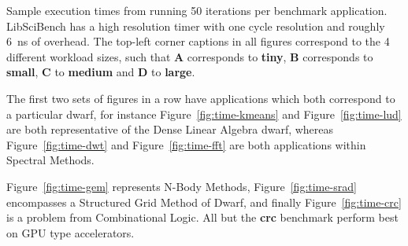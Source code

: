 \documentclass[../document.tex]{subfiles}
\begin{document}
%


Sample execution times from running 50 iterations per benchmark application.
LibSciBench has a high resolution timer with one cycle resolution and roughly \SI{6}{\nano\second} of overhead.
The top-left corner captions in all figures correspond to the 4 different workload sizes, such that {\bf A} corresponds to {\bf tiny}, {\bf B} corresponds to {\bf small}, {\bf C} to {\bf medium} and {\bf D} to {\bf large}.

The first two sets of figures in a row have applications which both correspond to a particular dwarf, for instance Figure~\ref{fig:time-kmeans} and Figure~\ref{fig:time-lud} are both representative of the Dense Linear Algebra dwarf, whereas Figure~\ref{fig:time-dwt} and Figure~\ref{fig:time-fft} are both applications within Spectral Methods.

Figure~\ref{fig:time-gem} represents N-Body Methods, Figure~\ref{fig:time-srad} encompasses a Structured Grid Method of Dwarf, and finally Figure~\ref{fig:time-crc} is a problem from Combinational Logic.
All but the {\bf crc} benchmark perform best on GPU type accelerators.

\end{document}

